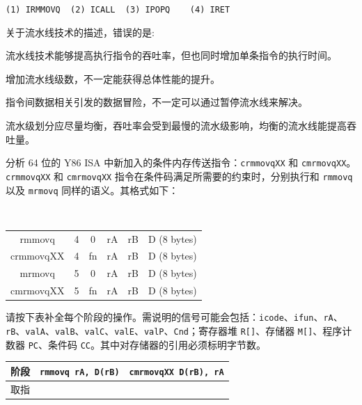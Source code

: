 \begin{problems}
\begin{choices}
            \item \verb|(1) IRMMOVQ  (2) ICALL  (3) IPOPQ    (4) IRET|
        \end{choices}
         关于流水线技术的描述，错误的是: 
        \begin{choices}
            \item 流水线技术能够提高执行指令的吞吐率，但也同时增加单条指令的执行时间。
            \item 增加流水线级数，不一定能获得总体性能的提升。
            \item 指令间数据相关引发的数据冒险，不一定可以通过暂停流水线来解决。
            \item 流水级划分应尽量均衡，吞吐率会受到最慢的流水级影响，均衡的流水线能提高吞吐量。
        \end{choices}
         分析 64 位的 Y86 ISA 中新加入的条件内存传送指令：\verb|crmmovqXX| 和 \verb|cmrmovqXX|。\verb|crmmovqXX| 和 \verb|cmrmovqXX| 指令在条件码满足所需要的约束时，分别执行和 \verb|rmmovq| 以及 \verb|mrmovq| 同样的语义。其格式如下：
        \begin{table}[H]
            \tt
            \centering
            \begin{tabular}{c|c|c|c|c|c|}
                \cline{2-6}
                rmmovq & 4 & 0 & rA & rB & D (8 bytes) \\ \cline{2-6} 
                crmmovqXX & 4 & fn & rA & rB & D (8 bytes) \\ \cline{2-6} 
                mrmovq & 5 & 0 & rA & rB & D (8 bytes) \\ \cline{2-6} 
                cmrmovqXX & 5 & fn & rA & rB & D (8 bytes) \\ \cline{2-6} 
            \end{tabular}
        \end{table}
        \qn 请按下表补全每个阶段的操作。需说明的信号可能会包括：\verb|icode|、\verb|ifun|、\verb|rA|、\verb|rB|、\verb|valA|、\verb|valB|、\verb|valC|、\verb|valE|、\verb|valP|、\verb|Cnd|；寄存器堆 \verb|R[]|、存储器 \verb|M[]|、程序计数器 \verb|PC|、条件码 \verb|CC|。其中对存储器的引用必须标明字节数。
        \begin{table}[H]
            \centering
            \begin{tabular}{|c|c|c|}
                \hline
                阶段 & {\qquad} \verb|rmmovq rA, D(rB)| {\qquad} & {\qquad} \verb|cmrmovqXX D(rB), rA| {\qquad} \\ \hline
                取指 & \multicolumn{2}{c|}{\rule{0pt}{10ex}} \\ \hline

\end{tabular}
\end{table}
\end{problems}
